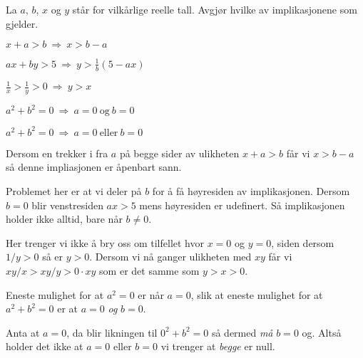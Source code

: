 \documentclass[a4paper,11pt]{article}
\begin{document}
\begin{problem}[1]
  La $a$, $b$, $x$ og $y$ står for vilkårlige reelle tall. Avgjør hvilke av
  implikasjonene som gjelder.
  \begin{subproblem}
    \label{subproblem:1.8-1a-oving-02-2019-MAT-0001}
    $x + a > b \ \Longrightarrow \ x > b - a$ \UiTcorrect
  \end{subproblem}
  \begin{subproblem}
    \label{subproblem:1.8-1b-oving-02-2019-MAT-0001}
    $ax +by > 5 \ \Longrightarrow \ y > \frac{1}{b}(5 - ax)$ \UiTwrong
  \end{subproblem}
  \begin{subproblem}
    \label{subproblem:1.8-1c-oving-02-2019-MAT-0001}
    $\frac{1}{x} > \frac{1}{y} > 0\ \Longrightarrow \ y > x$ \UiTcorrect
  \end{subproblem}
  \begin{subproblem}
    \label{subproblem:1.8-1d-oving-02-2019-MAT-0001}
    $a^2 + b^2 = 0 \ \Longrightarrow \ a = 0 \ \text{og} \ b = 0$ \UiTcorrect
  \end{subproblem}
  \begin{subproblem}
    \label{subproblem:1.8-1e-oving-02-2019-MAT-0001}
    $a^2 + b^2 = 0 \ \Longrightarrow \ a = 0 \ \text{eller} \ b = 0$ \UiTwrong
  \end{subproblem}
\end{problem}

\begin{solution}
  Dersom en trekker i fra $a$ på begge sider av ulikheten $x + a > b$ får vi
  $x > b - a$ så denne impliasjonen er åpenbart sann. \medskip

   Problemet her er at vi deler
  på $b$ for å få høyresiden av implikasjonen.  Dersom $b = 0$ blir
  venstresiden $ax > 5$ mens høyresiden er udefinert.  Så implikasjonen holder
  ikke alltid, bare når $b \neq 0$.  \medskip

   Her trenger vi ikke å bry
  oss om tilfellet hvor $x=0$ og $y=0$, siden dersom $1/y > 0$ så er $y>0$.
  Dersom vi nå ganger ulikheten med $xy$ får vi $xy/x > xy/y > 0 \cdot xy$ som
  er det samme som $y > x > 0$. \medskip

   Eneste mulighet for at $a^2
  = 0$ er når $a=0$, slik at eneste mulighet for at $a^2 + b^2 = 0$ er at
  $a=0$ \emph{og} $b=0$. \medskip

   Anta at $a = 0$, da blir
  likningen til $0^2 + b^2 = 0$ så dermed \emph{må} $b = 0$ og. Altså holder
  det ikke at $a = 0$ eller $b=0$ vi trenger at \emph{begge} er null.
\end{solution}
\end{document}
